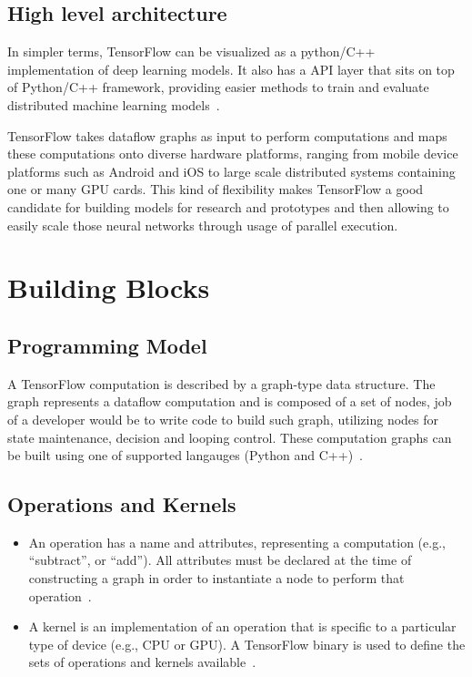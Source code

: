 \subsection*{High level architecture}
In simpler terms, TensorFlow can be visualized as a python/C++
implementation of deep learning models. It also has a API layer that
sits on top of Python/C++ framework, providing easier methods to train
and evaluate distributed machine learning
models~\cite{hid-sp18-510-tfblog}. 

TensorFlow takes dataflow graphs as input to perform computations and
maps these computations onto diverse hardware platforms, ranging from
mobile device platforms such as Android and iOS to large scale
distributed systems containing one or many GPU cards. This kind of
flexibility makes TensorFlow a good candidate for building models for
research and prototypes and then allowing to easily scale those neural
networks through usage of parallel execution. 


\section{Building Blocks}
\subsection*{Programming Model}
A TensorFlow computation is described by a graph-type data structure.
The graph represents a dataflow computation and is composed of a set
of nodes, job of a developer would be to write code to build such
graph, utilizing nodes for state maintenance, decision and looping
control. These computation graphs can be built using one of supported
langauges (Python and
C++)~\cite{hid-sp18-510-tensorflow2015-whitepaper}.   

\subsection*{Operations and Kernels}
\begin{itemize}
	\item An operation has a name and attributes, representing a
computation (e.g., “subtract”, or “add”). All attributes must be
declared at the time of constructing a graph in order to instantiate a
node to perform that
operation~\cite{hid-sp18-510-tensorflow2015-whitepaper}. 
\item A kernel is an implementation of an operation that is specific to a
particular type of device (e.g., CPU or GPU). A TensorFlow binary is
used to define the sets of operations and kernels
available~\cite{hid-sp18-510-tensorflow2015-whitepaper}.
\end{itemize}
